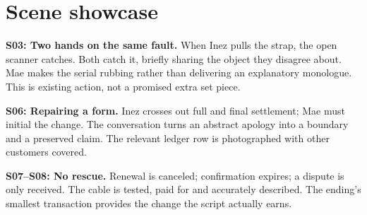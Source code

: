\section{Scene showcase}
\textbf{S03: Two hands on the same fault.} When Inez pulls the strap, the open scanner catches. Both catch it, briefly sharing the object they disagree about. Mae makes the serial rubbing rather than delivering an explanatory monologue. This is existing action, not a promised extra set piece.

\textbf{S06: Repairing a form.} Inez crosses out full and final settlement; Mae must initial the change. The conversation turns an abstract apology into a boundary and a preserved claim. The relevant ledger row is photographed with other customers covered.

\textbf{S07–S08: No rescue.} Renewal is canceled; confirmation expires; a dispute is only received. The cable is tested, paid for and accurately described. The ending's smallest transaction provides the change the script actually earns.
